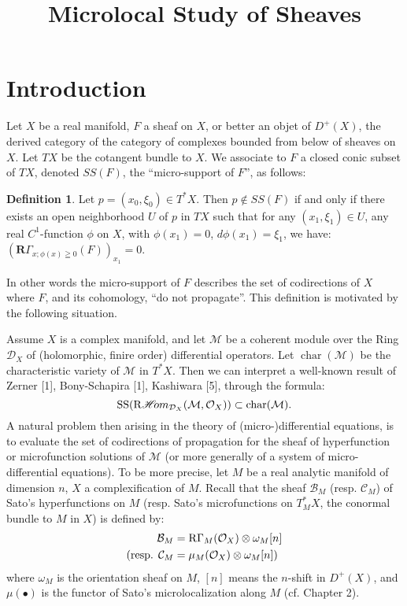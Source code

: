 \documentclass[11pt, letterpaper, draft, dvipdfmx]{book}
\theoremstyle{definition}
\newcommand{\rr}{\mathbf{R}}
\newcommand{\mcal}{\mathcal}
\newcommand{\Ch}{\mathop{\mathrm{char}}\nolimits}
\newcommand{\HOM}{\mathop{\mathscr{H}\hspace{-2pt}om}\nolimits}
\newcommand{\RHOM}{\mathop{\mathrm{R}\hspace{-1.5pt}\HOM}\nolimits}
\newcommand{\muS}{\mathop{\mathrm{SS}}\nolimits}
\newcommand{\RG}{\mathop{\mathrm{R}\hspace{-0pt}\Gamma}\nolimits}
\theoremstyle{mystyle}
\newtheorem{DFN}[Axiom]{Definition}
\numberwithin{equation}{section} %
\begin{document}
\title{Microlocal Study of Sheaves}
\date{}
\maketitle

\chapter*{Introduction}
Let $X$ be a real manifold, 
$F$ a sheaf on $X$, or better an objet of $D^+(X)$, 
the derived category of the category of complexes 
bounded from below of sheaves on $X$. 
Let $TX$ be the cotangent bundle to $X$. 
We associate to $F$ a closed conic subset of $TX$, 
denoted $SS (F)$, the ``micro-support of $F$'', as follows:

\begin{DFN}
    Let $p=(x_0,\xi_0)\in T^\ast X$. 
    Then $p\notin SS(F)$ if and only if 
    there exists an open neighborhood $U$ of $p$ in $TX$ 
    such that for any $(x_1,\xi_1) \in U$, 
    any real $C^1$-function $\phi$ on $X$, 
    with $\phi(x_1)=0$, $d\phi(x_1)=\xi_1$, 
    we have: $(\rr \Gamma_{x;\phi(x)\geqq 0} (F))_{x_1} =0$.
\end{DFN}

In other words 
the micro-support of $F$ describes 
the set of codirections of $X$ where $F$, and its cohomology, 
``do not propagate''. 
This definition is motivated by the following situation. 

Assume $X$ is a complex manifold, 
and let $\mcal{M}$ be a coherent module over 
the Ring $\mcal{D}_X$ of (holomorphic, finire order) 
differential operators. 
Let $\Ch(\mcal{M})$ be the characteristic variety 
of $\mcal{M}$ in $T^\ast X$. 
Then we can interpret a well-known result of Zerner [1], 
Bony-Schapira [1], Kashiwara [5], through the formula:
\begin{equation}
    \muS(\RHOM_{\mcal{D}_X}(\mcal{M},\mcal{O}_X))\subset\Ch(\mcal{M}).
\end{equation}
A natural problem then arising 
in the theory of (micro-)differential equations, 
is to evaluate the set of codirections of propagation for
the sheaf of hyperfunction or microfunction solutions 
of $\mcal{M}$ (or more generally 
of a system of micro-differential equations). 
To be more precise, 
let $M$ be a real analytic manifold of dimension $n$, 
$X$ a complexification of $M$. 
Recall that the sheaf $\mcal{B}_M$ (resp. $\mcal{C}_M$) 
of Sato's hyperfunctions on $M$ (resp. 
Sato's microfunctions on $T^{\ast}_{M}X$, 
the conormal bundle to $M$ in $X$) is defined by:
\begin{align*}
    \mcal{B}_M &= \RG_M(\mcal{O}_X)\otimes\omega_M[n]\\
    (\text{resp. }
    \mcal{C}_M &= \mu_M(\mcal{O}_X)\otimes\omega_M[n])
\end{align*}
where $\omega_M$ is the orientation sheaf on $M$, 
$[n]$ means the $n$-shift in $D^+(X)$, 
and $\mu(\bullet)$ is the functor of 
Sato's microlocalization along $M$ (cf. Chapter 2).
\end{document}

